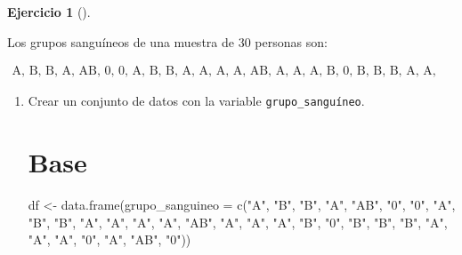 \documentclass[
  spanish,
  a4paper,
]{scrreport}
\newenvironment{Shaded}{\begin{snugshade}}{\end{snugshade}}
\newcommand{\AttributeTok}[1]{\textcolor[rgb]{0.40,0.45,0.13}{#1}}
\newcommand{\FunctionTok}[1]{\textcolor[rgb]{0.28,0.35,0.67}{#1}}
\newcommand{\NormalTok}[1]{\textcolor[rgb]{0.00,0.23,0.31}{#1}}
\newcommand{\OtherTok}[1]{\textcolor[rgb]{0.00,0.23,0.31}{#1}}
\newcommand{\StringTok}[1]{\textcolor[rgb]{0.13,0.47,0.30}{#1}}
\theoremstyle{definition}
\newtheorem{exercise}{Ejercicio}[chapter]
\theoremstyle{remark}
\begin{document}
\begin{exercise}[]\protect\hypertarget{exr-frecuencias-graficos-grupo-sanguineo}{}\label{exr-frecuencias-graficos-grupo-sanguineo}

Los grupos sanguíneos de una muestra de 30 personas son:

\[
\begin{array}{c}
\mbox{A, B, B, A, AB, 0, 0, A, B, B, A, A, A, A, AB, A, A, A, B, 0, B, B, B, A, A, A, 0, A, AB, 0}
\end{array}
\]

\begin{enumerate}
\def\labelenumi{\alph{enumi}.}
\item
  Crear un conjunto de datos con la variable \texttt{grupo\_sanguíneo}.

  \begin{tcolorbox}[enhanced jigsaw, breakable, leftrule=.75mm, toptitle=1mm, rightrule=.15mm, opacitybacktitle=0.6, left=2mm, colframe=quarto-callout-tip-color-frame, titlerule=0mm, toprule=.15mm, opacityback=0, bottomtitle=1mm, coltitle=black, colbacktitle=quarto-callout-tip-color!10!white, title=\textcolor{quarto-callout-tip-color}{\faLightbulb}\hspace{0.5em}{Solución}, arc=.35mm, bottomrule=.15mm, colback=white]

  \section{Base}

\begin{Shaded}
\begin{Highlighting}[]
\NormalTok{df }\OtherTok{\textless{}{-}} \FunctionTok{data.frame}\NormalTok{(}\AttributeTok{grupo\_sanguineo =} \FunctionTok{c}\NormalTok{(}\StringTok{"A"}\NormalTok{, }\StringTok{"B"}\NormalTok{, }\StringTok{"B"}\NormalTok{, }\StringTok{"A"}\NormalTok{, }\StringTok{"AB"}\NormalTok{, }\StringTok{"0"}\NormalTok{, }\StringTok{"0"}\NormalTok{, }\StringTok{"A"}\NormalTok{, }\StringTok{"B"}\NormalTok{, }\StringTok{"B"}\NormalTok{, }\StringTok{"A"}\NormalTok{, }\StringTok{"A"}\NormalTok{, }\StringTok{"A"}\NormalTok{, }\StringTok{"A"}\NormalTok{, }\StringTok{"AB"}\NormalTok{, }\StringTok{"A"}\NormalTok{, }\StringTok{"A"}\NormalTok{, }\StringTok{"A"}\NormalTok{, }\StringTok{"B"}\NormalTok{, }\StringTok{"0"}\NormalTok{, }\StringTok{"B"}\NormalTok{, }\StringTok{"B"}\NormalTok{, }\StringTok{"B"}\NormalTok{, }\StringTok{"A"}\NormalTok{, }\StringTok{"A"}\NormalTok{, }\StringTok{"A"}\NormalTok{, }\StringTok{"0"}\NormalTok{, }\StringTok{"A"}\NormalTok{, }\StringTok{"AB"}\NormalTok{, }\StringTok{"0"}\NormalTok{))}
\end{Highlighting}
\end{Shaded}


\end{tcolorbox}
\end{enumerate}
\end{exercise}
\end{document}
